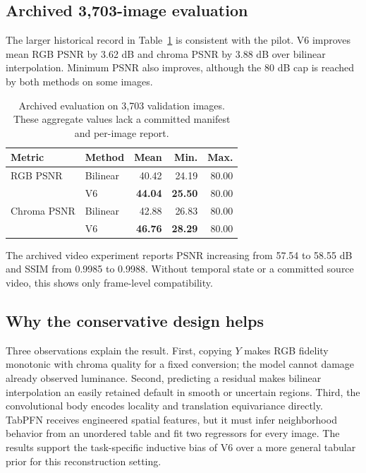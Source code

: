 \documentclass[10pt,twocolumn]{article}
\newcommand{\model}{V6}
\begin{document}
\subsection{Archived 3,703-image evaluation}

The larger historical record in Table~\ref{tab:archive} is consistent with the
pilot.  \model{} improves mean RGB PSNR by 3.62 dB and chroma PSNR by 3.88 dB
over bilinear interpolation.  Minimum PSNR also improves, although the 80 dB cap
is reached by both methods on some images.

\begin{table}[t]
  \centering
  \caption{Archived evaluation on 3,703 validation images.  These aggregate
  values lack a committed manifest and per-image report.}
  \label{tab:archive}
  \begin{tabular}{llrrr}
    \toprule
    Metric & Method & Mean & Min. & Max. \\
    \midrule
    RGB PSNR & Bilinear & 40.42 & 24.19 & 80.00 \\
             & V6       & \textbf{44.04} & \textbf{25.50} & 80.00 \\
    \addlinespace
    Chroma PSNR & Bilinear & 42.88 & 26.83 & 80.00 \\
                & V6       & \textbf{46.76} & \textbf{28.29} & 80.00 \\
    \bottomrule
  \end{tabular}
\end{table}

The archived video experiment reports PSNR increasing from 57.54 to 58.55 dB
and SSIM from 0.9985 to 0.9988.  Without temporal state or a committed source
video, this shows only frame-level compatibility.

\subsection{Why the conservative design helps}

Three observations explain the result.  First, copying $Y$ makes RGB fidelity
monotonic with chroma quality for a fixed conversion; the model cannot damage
already observed luminance.  Second, predicting a residual makes bilinear
interpolation an easily retained default in smooth or uncertain regions.  Third,
the convolutional body encodes locality and translation equivariance directly.
TabPFN receives engineered spatial features, but it must infer neighborhood
behavior from an unordered table and fit two regressors for every image.  The
results support the task-specific inductive bias of \model{} over a more general
tabular prior for this reconstruction setting.
\end{document}
